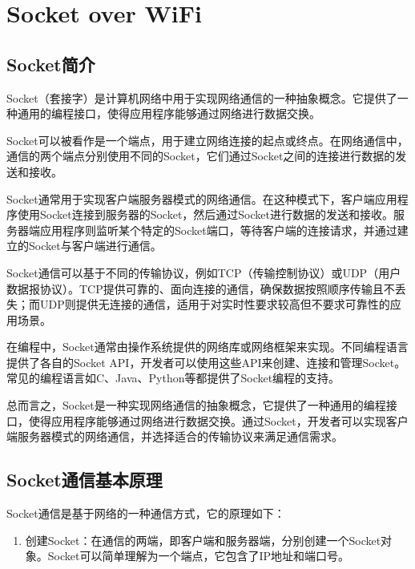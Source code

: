 \documentclass[a4paper,12pt,english]{sphinxmanual}
\begin{document}
{{\sphinxstepscope


\section{Socket over WiFi}
\label{\detokenize{exp-esp32/socket/index:socket-over-wifi}}\label{\detokenize{exp-esp32/socket/index::doc}}

\subsection{Socket简介}
\label{\detokenize{exp-esp32/socket/index:socket}}
\sphinxAtStartPar
Socket（套接字）是计算机网络中用于实现网络通信的一种抽象概念。它提供了一种通用的编程接口，使得应用程序能够通过网络进行数据交换。

\sphinxAtStartPar
Socket可以被看作是一个端点，用于建立网络连接的起点或终点。在网络通信中，通信的两个端点分别使用不同的Socket，它们通过Socket之间的连接进行数据的发送和接收。

\sphinxAtStartPar
Socket通常用于实现客户端\sphinxhyphen{}服务器模式的网络通信。在这种模式下，客户端应用程序使用Socket连接到服务器的Socket，然后通过Socket进行数据的发送和接收。服务器端应用程序则监听某个特定的Socket端口，等待客户端的连接请求，并通过建立的Socket与客户端进行通信。

\sphinxAtStartPar
Socket通信可以基于不同的传输协议，例如TCP（传输控制协议）或UDP（用户数据报协议）。TCP提供可靠的、面向连接的通信，确保数据按照顺序传输且不丢失；而UDP则提供无连接的通信，适用于对实时性要求较高但不要求可靠性的应用场景。

\sphinxAtStartPar
在编程中，Socket通常由操作系统提供的网络库或网络框架来实现。不同编程语言提供了各自的Socket API，开发者可以使用这些API来创建、连接和管理Socket。常见的编程语言如C、Java、Python等都提供了Socket编程的支持。

\sphinxAtStartPar
总而言之，Socket是一种实现网络通信的抽象概念，它提供了一种通用的编程接口，使得应用程序能够通过网络进行数据交换。通过Socket，开发者可以实现客户端\sphinxhyphen{}服务器模式的网络通信，并选择适合的传输协议来满足通信需求。


\subsection{Socket通信基本原理}
\label{\detokenize{exp-esp32/socket/index:id1}}
\sphinxAtStartPar
Socket通信是基于网络的一种通信方式，它的原理如下：
\begin{enumerate}
%
\item {} 
\sphinxAtStartPar
创建Socket：在通信的两端，即客户端和服务器端，分别创建一个Socket对象。Socket可以简单理解为一个端点，它包含了IP地址和端口号。


\end{enumerate}}}
\end{document}
